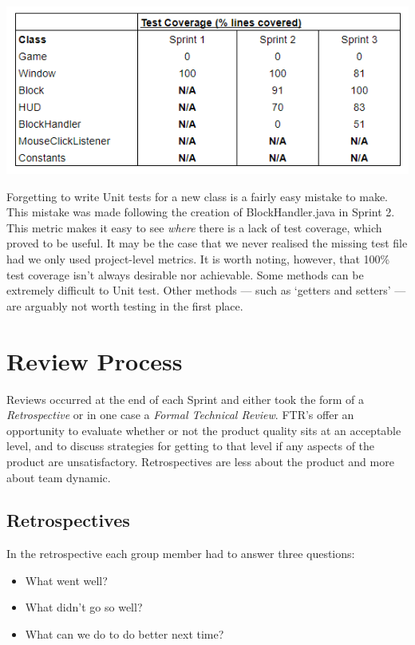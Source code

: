 \documentclass[12pt]{article}
\begin{document}
\begin{center}
    \includegraphics[scale=0.7]{images/class_level.png}
\end{center}

Forgetting to write Unit tests for a new class is a fairly easy mistake to make. This mistake was made following the creation of BlockHandler.java in Sprint 2. This metric makes it easy to see \emph{where} there is a lack of test coverage, which proved to be useful. It may be the case that we never realised the missing test file had we only used project-level metrics. It is worth noting, however, that 100\% test coverage isn't always desirable nor achievable. Some methods can be extremely difficult to Unit test. Other methods --- such as `getters and setters' --- are arguably not worth testing in the first place.

\section{Review Process}

Reviews occurred at the end of each Sprint and either took the form of a \emph{Retrospective} or in one case a \emph{Formal Technical Review}. FTR's offer an opportunity to evaluate whether or not the product quality sits at an acceptable level, and to discuss strategies for getting to that level if any aspects of the product are unsatisfactory. Retrospectives are less about the product and more about team dynamic.

\subsection{Retrospectives}

In the retrospective each group member had to answer three questions:

\begin{itemize}
\item What went well?
\item What didn’t go so well?
\item What can we do to do better next time?
\end{itemize}
\end{document}
